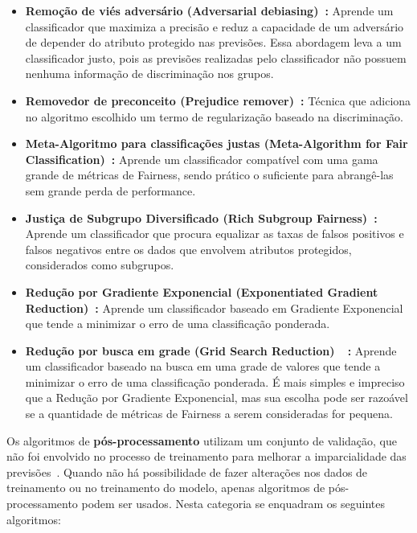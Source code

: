 \documentclass[portugues]{ic-tese}
\begin{document}
\begin{itemize}
\item \textbf{Remoção de viés adversário (Adversarial debiasing)~\citep{Zhang_2018}:} Aprende um classificador que maximiza a precisão e reduz a capacidade de um adversário de depender do atributo protegido nas previsões. Essa abordagem leva a um classificador justo, pois as previsões realizadas pelo classificador não possuem nenhuma informação de discriminação nos grupos.

\item \textbf{Removedor de preconceito (Prejudice remover)~\citep{Feldman_2015}:} Técnica que adiciona no algoritmo escolhido um termo de regularização baseado na discriminação.

\item \textbf{Meta-Algoritmo para classificações justas (Meta-Algorithm for Fair Classification)~\citep{Celis_2019}:} Aprende um classificador compatível com uma gama grande de métricas de Fairness, sendo prático o suficiente para abrangê-las sem grande perda de performance.

\item \textbf{Justiça de Subgrupo Diversificado (Rich Subgroup Fairness)~\citep{Kearns_2018}:} Aprende um classificador que procura equalizar as taxas de falsos positivos e falsos negativos entre os dados que envolvem atributos protegidos, considerados como subgrupos.

\item \textbf{Redução por Gradiente Exponencial (Exponentiated Gradient Reduction)~\citep{Agarwal_2018}:} Aprende um classificador baseado em Gradiente Exponencial que tende a minimizar o erro de uma classificação ponderada.

\item \textbf{Redução por busca em grade (Grid Search Reduction)~\citep{Agarwal_2018}~\citep{Agarwal_2019}:} Aprende um classificador baseado na busca em uma grade de valores que tende a minimizar o erro de uma classificação ponderada. É mais simples e impreciso que a Redução por Gradiente Exponencial, mas sua escolha pode ser razoável se a quantidade de métricas de Fairness a serem consideradas for pequena.

\end{itemize}

Os algoritmos de \textbf{pós-processamento} utilizam um conjunto de validação, que não foi envolvido no processo de treinamento para melhorar a imparcialidade das previsões~\citep{dAlessandro_2017}. Quando não há possibilidade de fazer alterações nos dados de treinamento ou no treinamento do modelo, apenas algoritmos de pós-processamento podem ser usados. Nesta categoria se enquadram os seguintes algoritmos:
\end{document}
